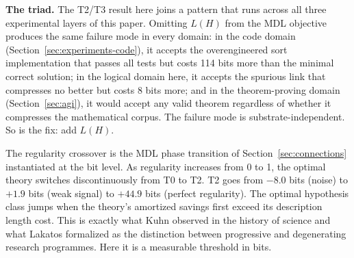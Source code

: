 \textbf{The triad.} The T2/T3 result here joins a pattern that runs
across all three experimental layers of this paper. Omitting $L(H)$
from the MDL objective produces the same failure mode in every domain:
in the code domain (Section~\ref{sec:experiments-code}), it accepts
the overengineered sort implementation that passes all tests but costs
114 bits more than the minimal correct solution; in the logical domain
here, it accepts the spurious link that compresses no better but costs
8 bits more; and in the theorem-proving domain
(Section~\ref{sec:agi}), it would accept any valid theorem regardless
of whether it compresses the mathematical corpus. The failure mode is
substrate-independent. So is the fix: add $L(H)$.

The regularity crossover is the MDL phase transition of
Section~\ref{sec:connections} instantiated at the bit level. As
regularity increases from 0 to 1, the optimal theory switches
discontinuously from T0 to T2. T2 goes from $-8.0$ bits (noise) to
$+1.9$ bits (weak signal) to $+44.9$ bits (perfect regularity). The
optimal hypothesis class jumps when the theory's amortized savings
first exceed its description length cost. This is exactly what Kuhn
observed in the history of science and what Lakatos formalized as the
distinction between progressive and degenerating research programmes.
Here it is a measurable threshold in bits.